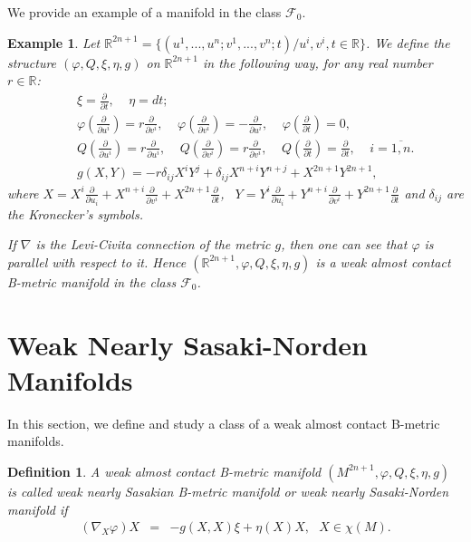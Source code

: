 \documentclass{article}
\newtheorem{definition}[theorem]{Definition}
\newtheorem{example}[theorem]{Example}
\begin{document}
We provide an example of a manifold in the class $\mathcal{F}_0$.

\begin{example}
Let $\mathbb{R}^{2n+1}=\{(u^1,...,u^n;v^1,...,v^n;t)\slash u^{i},v^{i},t\in\mathbb{R}\}$. We define the structure $(\varphi,Q,\xi,\eta, g)$ on $\mathbb{R}^{2n+1}$ in the following way, for any real number $r\in\mathbb{R}$:
\begin{eqnarray*}
&&	\xi=\frac{\partial}{\partial t}, \ \ \ \ \ \eta=dt;\\
&&	\varphi(\frac{\partial}{\partial u^{i}})=r\frac{\partial}{\partial v^{i}}, \ \ \ \ \	\varphi(\frac{\partial}{\partial v^{i}})=-\frac{\partial}{\partial u^{i}}, \ \ \ \ \ \varphi(\frac{\partial}{\partial t})=0, \ \ \ \ \  \\ 
&&	Q(\frac{\partial}{\partial u^{i}})=r\frac{\partial}{\partial u^{i}}, \ \ \ \ \ Q(\frac{\partial}{\partial v^{i}})=r\frac{\partial}{\partial v^{i}}, \ \ \ \ \ Q(\frac{\partial}{\partial t})=\frac{\partial}{\partial t}, \ \ \ \ \ i=\overline{1,n}.\\
&& g(X,Y)=-r\delta_{ij}X^{i}Y^{j}+\delta_{ij}X^{n+i}Y^{n+j}+X^{2n+1}Y^{2n+1},
\end{eqnarray*}
where $X=X^{i}\frac{\partial}{\partial u_i}+X^{n+i}\frac{\partial}{\partial v^{i}}+X^{2n+1}\frac{\partial}{\partial t}$, \ $Y=Y^{i}\frac{\partial}{\partial u_i}+Y^{n+i}\frac{\partial}{\partial v^{i}}+Y^{2n+1}\frac{\partial}{\partial t}$ and $\delta_{ij}$ are the Kronecker's symbols.\medskip

\noindent If $\nabla$ is the Levi-Civita connection of the metric $g$, then one can see that $\varphi$ is parallel with respect to it. Hence $(\mathbb{R}^{2n+1},\varphi,Q,\xi,\eta, g)$ is a weak almost contact B-metric manifold in the class $\mathcal{F}_0$.	
\end{example}

\section{Weak Nearly Sasaki-Norden Manifolds}

In this section, we define and study a class of a weak almost contact B-metric manifolds.

\begin{definition}
A weak almost contact B-metric manifold $(M^{2n+1},\varphi,Q,\xi,\eta, g)$ is called weak nearly Sasakian B-metric manifold or weak nearly Sasaki-Norden manifold if
\begin{eqnarray}
	(\nabla_X\varphi)X&=&-g(X,X)\xi+\eta(X)X, \ \ \ X\in\chi(M).  \label{w1}
\end{eqnarray}
\end{definition}
\end{document}
